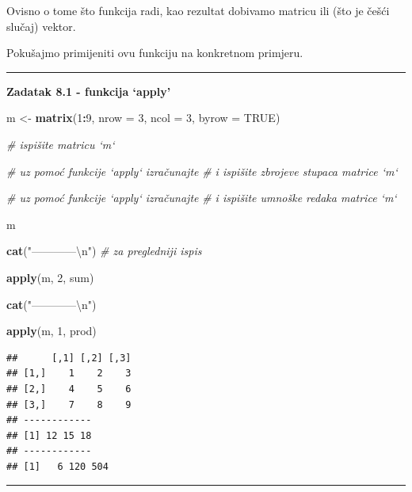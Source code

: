 \documentclass[]{book}
\newenvironment{Shaded}{\begin{snugshade}}{\end{snugshade}}
\newcommand{\KeywordTok}[1]{\textcolor[rgb]{0.13,0.29,0.53}{\textbf{#1}}}
\newcommand{\DataTypeTok}[1]{\textcolor[rgb]{0.13,0.29,0.53}{#1}}
\newcommand{\DecValTok}[1]{\textcolor[rgb]{0.00,0.00,0.81}{#1}}
\newcommand{\CharTok}[1]{\textcolor[rgb]{0.31,0.60,0.02}{#1}}
\newcommand{\StringTok}[1]{\textcolor[rgb]{0.31,0.60,0.02}{#1}}
\newcommand{\CommentTok}[1]{\textcolor[rgb]{0.56,0.35,0.01}{\textit{#1}}}
\newcommand{\OtherTok}[1]{\textcolor[rgb]{0.56,0.35,0.01}{#1}}
\newcommand{\OperatorTok}[1]{\textcolor[rgb]{0.81,0.36,0.00}{\textbf{#1}}}
\newcommand{\NormalTok}[1]{#1}
\theoremstyle{definition}
\theoremstyle{definition}
\theoremstyle{definition}
\theoremstyle{remark}
\begin{document}
Ovisno o tome što funkcija radi, kao rezultat dobivamo matricu ili (što
je češći slučaj) vektor.

Pokušajmo primijeniti ovu funkciju na konkretnom primjeru.

\begin{center}\rule{0.5\linewidth}{\linethickness}\end{center}

\textbf{Zadatak 8.1 - funkcija `apply'}

\begin{Shaded}
\begin{Highlighting}[]
\NormalTok{m <-}\StringTok{ }\KeywordTok{matrix}\NormalTok{(}\DecValTok{1}\OperatorTok{:}\DecValTok{9}\NormalTok{, }\DataTypeTok{nrow =} \DecValTok{3}\NormalTok{, }\DataTypeTok{ncol =} \DecValTok{3}\NormalTok{, }\DataTypeTok{byrow =} \OtherTok{TRUE}\NormalTok{)}

\CommentTok{# ispišite matricu `m`}

\CommentTok{# uz pomoć funkcije `apply` izračunajte }
\CommentTok{# i ispišite zbrojeve stupaca matrice `m` }


\CommentTok{# uz pomoć funkcije `apply` izračunajte }
\CommentTok{# i ispišite umnoške redaka matrice `m` }
\end{Highlighting}
\end{Shaded}

\begin{Shaded}
\begin{Highlighting}[]
\NormalTok{m}

\KeywordTok{cat}\NormalTok{(}\StringTok{"------------}\CharTok{\textbackslash{}n}\StringTok{"}\NormalTok{)  }\CommentTok{# za pregledniji ispis}

\KeywordTok{apply}\NormalTok{(m, }\DecValTok{2}\NormalTok{, sum)}

\KeywordTok{cat}\NormalTok{(}\StringTok{"------------}\CharTok{\textbackslash{}n}\StringTok{"}\NormalTok{) }

\KeywordTok{apply}\NormalTok{(m, }\DecValTok{1}\NormalTok{, prod)}
\end{Highlighting}
\end{Shaded}

\begin{verbatim}
##      [,1] [,2] [,3]
## [1,]    1    2    3
## [2,]    4    5    6
## [3,]    7    8    9
## ------------
## [1] 12 15 18
## ------------
## [1]   6 120 504
\end{verbatim}

\begin{center}\rule{0.5\linewidth}{\linethickness}\end{center}
\end{document}
